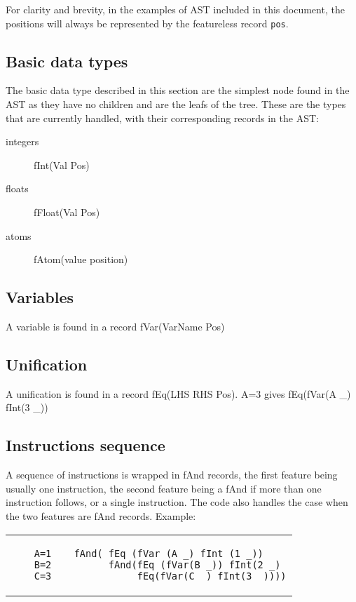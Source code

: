 \documentclass[a4paper]{memoir}
\begin{document}
For clarity and brevity, in the examples of AST included in this document, the positions will always be represented by the featureless record \lstinline!pos!. 
\subsection{Basic data types}
The basic data type described in this section are the simplest node found in the AST as they have no children and are the leafs of the tree.
These are the types that are currently handled, with their corresponding records in the AST:
\begin{description}
  \item[integers] fInt(Val Pos)
  \item[floats] fFloat(Val Pos)
  \item[atoms] fAtom(value position)
\end{description}

\subsection{Variables}\label{sec:input:variables}
A variable is found in a record fVar(VarName Pos)

\subsection{Unification}
A unification is found in a record fEq(LHS RHS Pos).
A=3 gives fEq(fVar(A \_) fInt(3 \_))

\subsection{Instructions sequence}
A sequence of instructions is wrapped in fAnd records, the first feature being usually one instruction, the second feature being a fAnd if more than one instruction follows,  or a single instruction. The code also handles the case when the two features are fAnd records. %
Example:\\
\begin{tabular}{ p{} p{} }
  \begin{lstlisting}
    A=1
    B=2
    C=3
  \end{lstlisting}
&
  \footnotesize{
  \begin{verbatim}
  fAnd( fEq (fVar (A _) fInt (1 _))
        fAnd(fEq (fVar(B _)) fInt(2 _) 
             fEq(fVar(C _) fInt(3 _))))
  \end{verbatim}
  }
\end{tabular}
\end{document}
